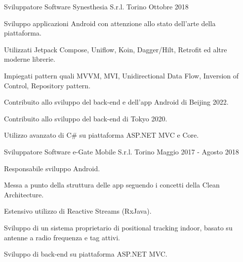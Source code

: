 

\begin{cventries}

  \cventry
    {Sviluppatore Software} %
    {Synesthesia S.r.l.} %
    {Torino} %
    {Ottobre 2018 \rightarrow} %
    {
      \begin{cvitems} %
        \item {Sviluppo applicazioni Android con attenzione allo stato dell'arte della piattaforma.}
        \item {Utilizzati Jetpack Compose, Uniflow, Koin, Dagger/Hilt, Retrofit ed altre moderne librerie.}
        \item {Impiegati pattern quali MVVM, MVI, Unidirectional Data Flow, Inversion of Control, Repository pattern.}
        \item {Contribuito allo sviluppo del back-end e dell'app Android di Beijing 2022.}
        \item {Contribuito allo sviluppo del back-end di Tokyo 2020.}
        \item {Utilizzo avanzato di C\# su piattaforma ASP.NET MVC e Core.}
      \end{cvitems}
    }

  \cventry
    {Sviluppatore Software} %
    {e-Gate Mobile S.r.l.} %
    {Torino} %
    {Maggio 2017 - Agosto 2018} %
    {
      \begin{cvitems} %
        \item {Responsabile sviluppo Android.}
        \item {Messa a punto della struttura delle app seguendo i concetti della Clean Architecture.}
        \item {Estensivo utilizzo di Reactive Streams (RxJava).}
        \item {Sviluppo di un sistema proprietario di positional tracking indoor, basato su antenne a radio frequenza e tag attivi.}
        \item {Sviluppo di back-end su piattaforma ASP.NET MVC.}
      \end{cvitems}
    }


\end{cventries}
